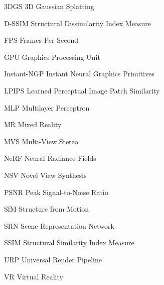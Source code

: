 \listoffigures*
\cleardoublepage

\listoftables*
\cleardoublepage

\listofquadros*
\cleardoublepage
\listofequacao*
\cleardoublepage

\begin{siglas}
    \item[3DGS]       3D Gaussian Splatting
    \item[D-SSIM]     Structural Dissimilarity Index Measure
    \item[FPS]        Frames Per Second
    \item[GPU]        Graphics Processing Unit
    \item[Instant-NGP] Instant Neural Graphics Primitives
    \item[LPIPS]      Learned Perceptual Image Patch Similarity
    \item[MLP]        Multilayer Perceptron
    \item[MR]         Mixed Reality
    \item[MVS]        Multi-View Stereo
    \item[NeRF]       Neural Radiance Fields
    \item[NSV]        Novel View Synthesis
    \item[PSNR]       Peak Signal-to-Noise Ratio
    \item[SfM]        Structure from Motion
    \item[SRN]        Scene Representation Network
    \item[SSIM]       Structural Similarity Index Measure
    \item[URP]        Universal Render Pipeline
    \item[VR]         Virtual Reality
\end{siglas}


\tableofcontents*
\cleardoublepage
